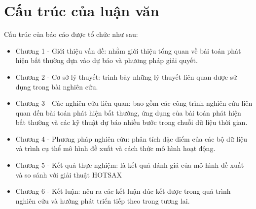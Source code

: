 \section{Cấu trúc của luận văn}
Cấu trúc của báo cáo được tổ chức như sau:
\begin{itemize}
\item Chương 1 - Giới thiệu vấn đề: nhằm giới thiệu tổng quan về bái toán phát hiện bất thường dựa vào dự báo và phương pháp giải quyết.
\item Chương 2 - Cơ sở lý thuyết: trình bày những lý thuyết liên quan được sử dụng trong bài nghiên cứu.
\item Chương 3 - Các nghiên cứu liên quan: bao gồm các công trình nghiên cứu liên quan đến bài toán phát hiện bất thường, ứng dụng của bài toán phát hiện bất thường và các kỹ thuật dự báo nhiều bước trong chuỗi dữ liệu thời gian.
\item Chương 4 - Phương pháp nghiên cứu: phân tích đặc điểm của các bộ dữ liệu và trình cụ thể mô hình đề xuất và cách thức mô hình hoạt động. 
\item Chương 5 - Kết quả thực nghiệm: là kết quả đánh giá của mô hình đề xuất và so sánh với giải thuật HOTSAX 
\item Chương 6 - Kết luận: nêu ra các kết luận đúc kết được trong quá trình nghiên cứu và hướng phát triển tiếp theo trong tương lai. 
\end{itemize}

